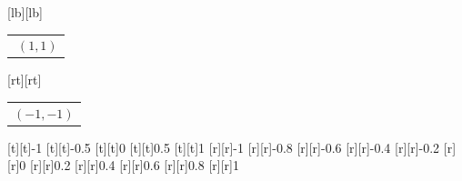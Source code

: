 %    
%
%
\begin{psfrags}%
\psfragscanon%
%
[lb][lb]{\color[rgb]{0,0,0}\setlength{\tabcolsep}{0pt}\begin{tabular}{l}$\;(1,1)$\end{tabular}}%
  [rt][rt]{\color[rgb]{0,0,0}\setlength{\tabcolsep}{0pt}\begin{tabular}{r}$(-1,-1)$\end{tabular}}%
%
[t][t]{-1}%
[t][t]{-0.5}%
[t][t]{0}%
[t][t]{0.5}%
[t][t]{1}%
%
[r][r]{-1}%
[r][r]{-0.8}%
[r][r]{-0.6}%
[r][r]{-0.4}%
[r][r]{-0.2}%
[r][r]{0}%
[r][r]{0.2}%
[r][r]{0.4}%
[r][r]{0.6}%
[r][r]{0.8}%
[r][r]{1}%
%
%
\end{psfrags}%
%

